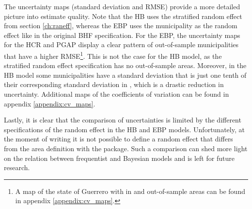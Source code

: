 The uncertainty maps (standard deviation and RMSE) provide a more detailed picture into estimate quality.
Note that the HB uses the stratified random effect from section \ref{ch:raneff}, whereas the EBP uses the municipality as the random effect like in the original BHF specification.
For the EBP, the uncertainty maps for the HCR and PGAP display a clear pattern of out-of-sample municipalities that have a higher RMSE\footnote{A map of the state of Guerrero with in and out-of-sample areas can be found in appendix \ref{appendix:cv_maps}.}.
This is not the case for the HB model, as the stratified random effect specification has no out-of-sample areas.
Moreover, in the HB model some municipalities have a standard deviation that is just one tenth of their corresponding standard deviation in \cite{morelli_hierarchical_2021}, which is a drastic reduction in uncertainty.
Additional maps of the coefficients of variation can be found in appendix \ref{appendix:cv_maps}.

Lastly, it is clear that the comparison of uncertainties is limited by the different specifications of the random effect in the HB and EBP models.
Unfortunately, at the moment of writing it is not possible to define a random effect that differs from the area definition with the  package.
Such a comparison can shed more light on the relation between frequentist and Bayesian models and is left for future research.
